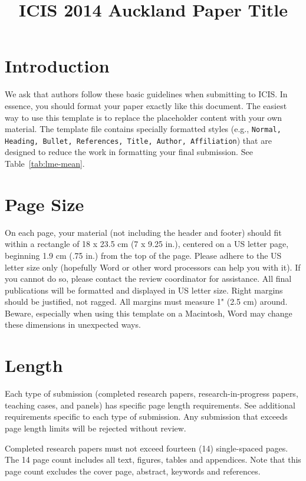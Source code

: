 \documentclass{icis}
\title{ICIS 2014 Auckland Paper Title}
\begin{document}

\maketitle

\section{Introduction}

We ask that authors follow these basic guidelines when submitting to ICIS. In
essence, you should format your paper exactly like this document. The easiest
way to use this template is to replace the placeholder content with your own
material. The template file contains specially formatted styles (e.g.,
\texttt{Normal, Heading, Bullet, References, Title, Author, Affiliation}) that
are designed to reduce the work in formatting your final submission. See
Table~\ref{tab:lme-mean}.

\section{Page Size}
On each page, your material (not including the header and footer) should fit
within a rectangle of 18 x 23.5 cm (7 x 9.25 in.), centered on a US letter page,
beginning 1.9 cm (.75 in.) from the top of the page.  Please adhere to the US
letter size only (hopefully Word or other word processors can help you with
it). If you cannot do so, please contact the review coordinator for
assistance. All final publications will be formatted and displayed in US letter
size. Right margins should be justified, not ragged. All margins must measure 1"
(2.5 cm) around. Beware, especially when using this template on a Macintosh,
Word may change these dimensions in unexpected ways.

\section{Length}
Each type of submission (completed research papers, research-in-progress papers,
teaching cases, and panels) has specific page length requirements. See
additional requirements specific to each type of submission. Any submission that
exceeds page length limits will be rejected without review.

Completed research papers must not exceed fourteen (14) single-spaced pages. The
14 page count includes all text, figures, tables and appendices. Note that this
page count excludes the cover page, abstract, keywords and references. 
\end{document}
